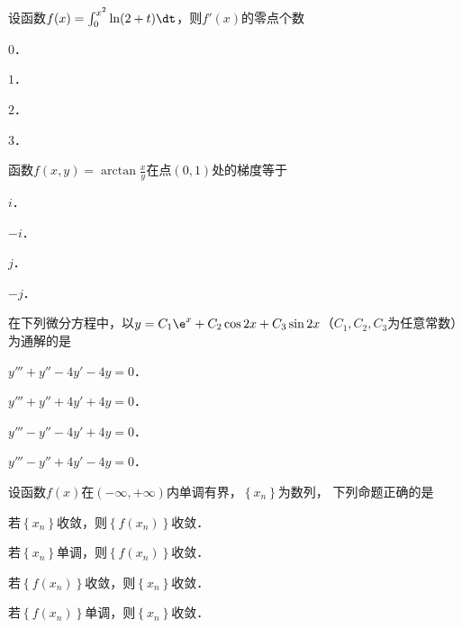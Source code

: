 \documentclass[plain,noanswer,medmath]{../../template/jnuexam}
\begin{document}




\begin{problem}
设函数$f(x) = \int_0^{x^2} \ln(2 + t)\dt$，则$f'(x)$的零点个数\pickout{}
\begin{abcd}
\item $0$．
\item $1$．
\item $2$．
\item $3$．
\end{abcd}
\end{problem}


\begin{problem}
函数$f(x,y) = \arctan \frac{x}{y}$在点$(0,1)$处的梯度等于\pickout{}
\begin{abcd}
\item $i$．
\item $- i$．
\item $j$．
\item $- j$．
\end{abcd}
\end{problem}


\begin{problem}
在下列微分方程中，以$y = C_1\e^x + C_2\cos 2x + C_3\sin 2x$（$C_1,C_2,C_3$为任意常数）为通解的是\pickout{}
\begin{abcd}
\item $y''' + y'' - 4y' - 4y = 0$．
\item $y''' + y'' + 4y' + 4y = 0$．
\item $y''' - y'' - 4y' + 4y = 0$．
\item $y''' - y'' + 4y' - 4y = 0$．
\end{abcd}
\end{problem}


\begin{problem}
设函数$f(x)$在$(-\infty , +\infty)$内单调有界，$\left\{x_n \right\}$为数列，
下列命题正确的是\pickout{}
\begin{abcd}
\item 若$\left\{x_n \right\}$收敛，则$\left\{f(x_n) \right\}$收敛．
\item 若$\left\{x_n \right\}$单调，则$\left\{f(x_n) \right\}$收敛．
\item 若$\left\{f(x_n) \right\}$收敛，则$\left\{x_n \right\}$收敛．
\item 若$\left\{f(x_n) \right\}$单调，则$\left\{x_n \right\}$收敛．
\end{abcd}
\end{problem}
\end{document}
